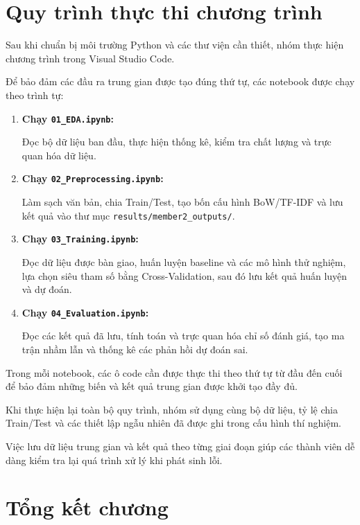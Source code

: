 \section{Quy trình thực thi chương trình}

Sau khi chuẩn bị môi trường Python và các thư viện cần thiết, nhóm thực hiện chương trình trong Visual Studio Code.

Để bảo đảm các đầu ra trung gian được tạo đúng thứ tự, các notebook được chạy theo trình tự:

\begin{enumerate}
    \item \textbf{Chạy \texttt{01\_EDA.ipynb}:}

    Đọc bộ dữ liệu ban đầu, thực hiện thống kê, kiểm tra chất lượng và trực quan hóa dữ liệu.

    \item \textbf{Chạy \texttt{02\_Preprocessing.ipynb}:}

    Làm sạch văn bản, chia Train/Test, tạo bốn cấu hình BoW/TF-IDF và lưu kết quả vào thư mục \texttt{results/member2\_outputs/}.

    \item \textbf{Chạy \texttt{03\_Training.ipynb}:}

    Đọc dữ liệu được bàn giao, huấn luyện baseline và các mô hình thử nghiệm, lựa chọn siêu tham số bằng Cross-Validation, sau đó lưu kết quả huấn luyện và dự đoán.

    \item \textbf{Chạy \texttt{04\_Evaluation.ipynb}:}

    Đọc các kết quả đã lưu, tính toán và trực quan hóa chỉ số đánh giá, tạo ma trận nhầm lẫn và thống kê các phản hồi dự đoán sai.
\end{enumerate}

Trong mỗi notebook, các ô code cần được thực thi theo thứ tự từ đầu đến cuối để bảo đảm những biến và kết quả trung gian được khởi tạo đầy đủ.

Khi thực hiện lại toàn bộ quy trình, nhóm sử dụng cùng bộ dữ liệu, tỷ lệ chia Train/Test và các thiết lập ngẫu nhiên đã được ghi trong cấu hình thí nghiệm.

Việc lưu dữ liệu trung gian và kết quả theo từng giai đoạn giúp các thành viên dễ dàng kiểm tra lại quá trình xử lý khi phát sinh lỗi.



\section{Tổng kết chương}

